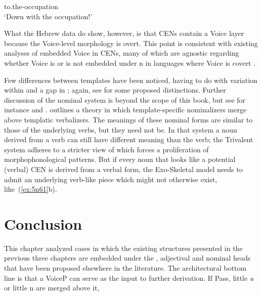 \begin{exe}
\begin{xlist}
\begin{exe}
\begin{xlist}
\begin{exe}
\begin{exe}
\begin{xlist}
\begin{exe}
\begin{exe}
\begin{xlist}
\begin{exe}
\begin{xlist}
\begin{exe}
\begin{xlist}
\begin{exe}
\begin{xlist}
\begin{exe}
\begin{xlist}
\begin{xlist}
\begin{exe}
\begin{xlist}
\begin{exe}
\begin{xlist}
\begin{exe}
\begin{exe}
\begin{exe}
\begin{xlist}
\begin{exe}
\begin{exe}
\begin{xlist}
\begin{exe}
\begin{xlist}
\begin{exe}
\begin{xlist}
\begin{exe}
\begin{xlist}
\begin{xlist}
\begin{exe}
\begin{xlist}
\begin{exe}
\begin{xlist}
\begin{exe}
\begin{xlist}
\begin{exe}
\begin{xlist}
\begin{exe}
\begin{exe}
\begin{exe}
\begin{exe}
\begin{exe}
\begin{xlist}
\begin{xlist}
\begin{exe}
\begin{xlist}
\begin{exe}
\begin{xlist}
\begin{exe}
\begin{exe}
\begin{exe}
\begin{xlist}
\begin{exe}
\begin{xlist}
\begin{exe}
\begin{xlist}
\begin{exe}
\begin{exe}
\begin{xlist}
\begin{exe}
\begin{exe}
\begin{exe}
\begin{xlist}
\begin{xlist}
\begin{exe}
\begin{exe}
\begin{exe}
\begin{xlist}
\begin{exe}
\begin{xlist}
{to.the-occupation\\
 		\glt `Down with the occupation!' } 
		
 \z
\z 

What the Hebrew data do show, however, is that CENs contain a Voice layer because the Voice-level morphology is overt. This point is consistent with existing analyses of embedded Voice in CENs, many of which are agnostic regarding whether Voice is or is not embedded under n in languages where Voice is covert \citep{alexiadou17,wood19lsa}.

Few differences between templates have been noticed, having to do with variation within {\tkal} \citep{borer13oup} and a gap in {\tnif} \citep{silonipreminger09,ahdoutkastner19nels}; again, see \cite{ahdout19glow,ahdout19phd} for some proposed distinctions. Further discussion of the nominal system is beyond the scope of this book, but see for instance \cite{fausthever10} and \cite{laks15ws}. \citet[534fn13, 555]{borer13oup} outlines a theory in which template-specific nominalizers merge above templatic verbalizers. The meanings of these nominal forms are similar to those of the underlying verbs, but they need not be. In that system a noun derived from a verb can still have different meaning than the verb; the Trivalent system adheres to a stricter view of  which forces a proliferation of morphophonological patterns. But if every noun that looks like a potential (verbal) CEN is derived from a verbal form, the Exo-Skeletal model needs to admit an underlying verb-like piece which might not otherwise exist, like~(\ref{ex:5n61}b).


\section{Conclusion} \label{passn:conc}
This chapter analyzed cases in which the existing structures presented in the previous three chapters are embedded under the , adjectival and nominal heads that have been proposed elsewhere in the literature. The architectural bottom line is that a VoiceP can serve as the input to further derivation. If Pass, little \textit{a} or little n are merged above it, 
\end{xlist}
\end{exe}
\end{xlist}
\end{exe}
\end{exe}
\end{exe}
\end{xlist}
\end{xlist}
\end{exe}
\end{exe}
\end{exe}
\end{xlist}
\end{exe}
\end{exe}
\end{xlist}
\end{exe}
\end{xlist}
\end{exe}
\end{xlist}
\end{exe}
\end{exe}
\end{exe}
\end{xlist}
\end{exe}
\end{xlist}
\end{exe}
\end{xlist}
\end{xlist}
\end{exe}
\end{exe}
\end{exe}
\end{exe}
\end{exe}
\end{xlist}
\end{exe}
\end{xlist}
\end{exe}
\end{xlist}
\end{exe}
\end{xlist}
\end{exe}
\end{xlist}
\end{xlist}
\end{exe}
\end{xlist}
\end{exe}
\end{xlist}
\end{exe}
\end{xlist}
\end{exe}
\end{exe}
\end{xlist}
\end{exe}
\end{exe}
\end{exe}
\end{xlist}
\end{exe}
\end{xlist}
\end{exe}
\end{xlist}
\end{xlist}
\end{exe}
\end{xlist}
\end{exe}
\end{xlist}
\end{exe}
\end{xlist}
\end{exe}
\end{xlist}
\end{exe}
\end{exe}
\end{xlist}
\end{exe}
\end{exe}
\end{xlist}
\end{exe}
\end{xlist}
\end{exe}
